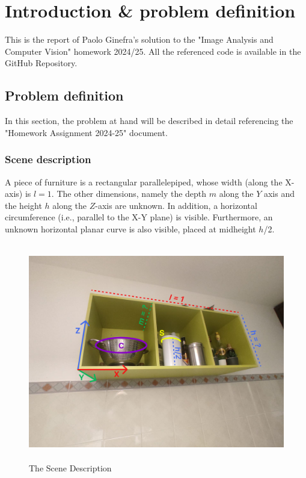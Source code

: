 \chapter*{Introduction \& problem definition}
This is the report of Paolo Ginefra's solution to the "Image Analysis and Computer Vision" homework 2024/25.
All the referenced code is available in the GitHub Repository.

\section{Problem definition}
In this section, the problem at hand will be described in detail referencing the "Homework Assignment 2024-25" document.
\subsection{Scene description}
 A piece of furniture is a rectangular parallelepiped, whose width (along the X-axis) is $l = 1$. 
The other dimensions, namely the depth $m$ along the $Y$ axis and the height $h$ along the $Z$-axis are 
unknown. In addition, a horizontal circumference (i.e., parallel to the X-Y plane) is visible. 
Furthermore, an unknown horizontal planar curve is also visible, placed at midheight $h$/2. 

\begin{figure}[!ht]
\centering
\includegraphics[height=9.5cm, width=\textwidth, keepaspectratio]{Report/Images/Introduction/Scene Description.png}
\caption{\label{fig:SceneDescription}The Scene Description}
\end{figure}

